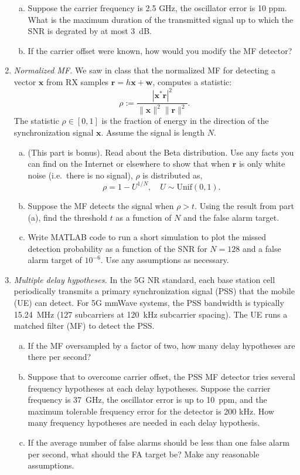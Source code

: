 \documentclass[11pt]{article}
\newcommand{\rbf}{\mathbf{r}}
\newcommand{\wbf}{\mathbf{w}}
\newcommand{\xbf}{\mathbf{x}}
\begin{document}
\begin{enumerate}
\begin{enumerate}[(a)]
\item Suppose the carrier frequency is 2.5 GHz,  the oscillator error is
10 ppm.  What is the maximum duration of the transmitted signal up to which
the SNR is degrated by at most 3~dB.

\item If the carrier offset were known, how would you modify the MF
detector?
\end{enumerate}

\item \emph{Normalized MF.}  We saw in class that the normalized MF
for detecting a vector
$\xbf$ from RX samples $\rbf = h\xbf + \wbf$, computes a statistic:
\[
    \rho := \frac{|\xbf^*\rbf|^2}{\|\xbf\|^2\|\rbf\|^2}.
\]
The statistic $\rho \in [0,1]$ is the fraction of energy in the direction
of the synchronization signal $\xbf$.
Assume the signal is length $N$.
\begin{enumerate}[(a)]
\item   (This part is bonus).
Read about the Beta distribution.  Use any facts you can find
on the Internet or elsewhere to show that when
$\rbf$ is only white noise (i.e.\ there is no signal), $\rho$ is
distributed as,
\[
    \rho = 1-U^{1/N},  \quad U \sim \mathrm{Unif}(0,1).
\]

\item Suppose the MF detects the signal when $\rho > t$.
Using the result from part (a), find the threshold $t$ as a function
of $N$ and the false alarm target.

\item Write MATLAB code to run a short simulation to plot the
missed detection probability as a function of the SNR for $N=128$
and a false alarm target of $10^{-6}$.  Use any assumptions as necessary.
\end{enumerate}

\item \emph{Multiple delay hypotheses.}
In the 5G NR standard, each base station cell periodically transmits a
primary synchronization signal (PSS) that the mobile (UE) can detect.
For 5G mmWave systems, the PSS bandwidth is typically
15.24~MHz (127 subcarriers at 120~kHz subcarrier spacing).
The UE runs a matched filter (MF) to detect the PSS.
\begin{enumerate}[(a)]
\item If the MF oversampled by a factor of two, how many delay hypotheses
are there per second?

\item Suppose that to overcome carrier offset, the PSS MF detector
tries several frequency hypotheses at each delay hypotheses.
Suppose the carrier frequency is 37~GHz, the oscillator error is up to 10~ppm,
and the maximum tolerable frequency error for the detector is 200 kHz.
How many frequency hypotheses are needed in each delay hypothesis.

\item If the average number of false alarms should be less than one
false alarm per second, what should the FA target be?
Make any reasonable assumptions.
\end{enumerate}


\end{enumerate}
\end{document}
